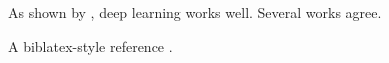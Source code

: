 \documentclass{article}
\begin{document}
As shown by \citet{Smith2020}, deep learning works well.
Several works \citep[see][p.~3]{Brown2022, Jones2021} agree.

A biblatex-style reference \autocite{Green2023}.


\end{document}
